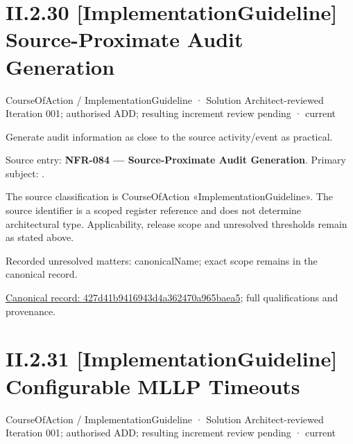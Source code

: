 \section*{II.2.30 [ImplementationGuideline] Source-Proximate Audit Generation}
\label{navigation:II.2.30}

\label{element:427d41b9416943d4a362470a965baea5}
{\small CourseOfAction / ImplementationGuideline · Solution Architect-reviewed Iteration 001; authorised ADD; resulting increment review pending · current}\par

Generate audit information as close to the source activity/event as practical.



Source entry: \textbf{NFR-084 — Source-Proximate Audit Generation}. Primary subject: \texttt{}.



The source classification is CourseOfAction «ImplementationGuideline». The source identifier is a scoped register reference and does not determine architectural type. Applicability, release scope and unresolved thresholds remain as stated above.


{\small Recorded unresolved matters: canonicalName; exact scope remains in the canonical record.}\par
{\footnotesize \href{../../../../../../../continuum/strategy/course-of-action/implementation-guideline/427d41b9416943d4a362470a965baea5.md}{Canonical record: 427d41b9416943d4a362470a965baea5}; full qualifications and provenance.}\par
\section*{II.2.31 [ImplementationGuideline] Configurable MLLP Timeouts}
\label{navigation:II.2.31}

\label{element:267142b7a01a49c686458b9fc1c8d7b2}
{\small CourseOfAction / ImplementationGuideline · Solution Architect-reviewed Iteration 001; authorised ADD; resulting increment review pending · current}\par

